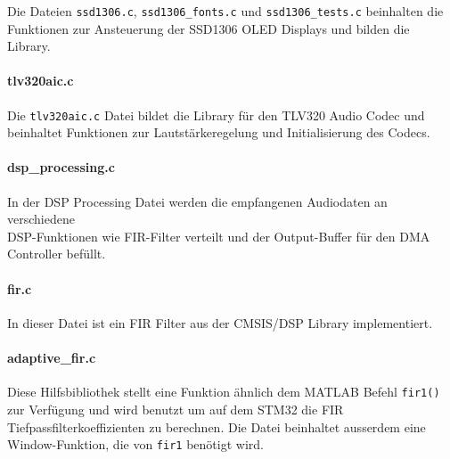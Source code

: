 Die Dateien \texttt{ssd1306.c}, \texttt{ssd1306\_fonts.c} und \texttt{ssd1306\_tests.c} beinhalten die Funktionen zur Ansteuerung der SSD1306 OLED Displays und bilden die Library.


\paragraph{tlv320aic.c}

Die \texttt{tlv320aic.c} Datei bildet die Library für den TLV320 Audio Codec und beinhaltet Funktionen zur Lautstärkeregelung und Initialisierung des Codecs.


\paragraph{dsp\_processing.c}

In der DSP Processing Datei werden die empfangenen Audiodaten an verschiedene \\
DSP-Funktionen wie FIR-Filter verteilt und der Output-Buffer für den DMA Controller befüllt.


\paragraph{fir.c}

In dieser Datei ist ein FIR Filter aus der CMSIS/DSP Library implementiert.


\paragraph{adaptive\_fir.c}

Diese Hilfsbibliothek stellt eine Funktion ähnlich dem MATLAB Befehl \texttt{fir1()} zur Verfügung und wird benutzt um auf dem STM32 die FIR Tiefpassfilterkoeffizienten zu berechnen.
Die Datei beinhaltet ausserdem eine Window-Funktion, die von \texttt{fir1} benötigt wird.

